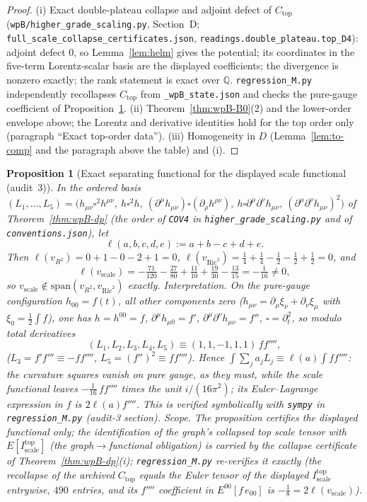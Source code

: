 \documentclass{article}
\newtheorem{proposition}{Proposition}
\theoremstyle{remark}
\begin{document}
\begin{proof}
(i) Exact double-plateau collapse and adjoint defect of $C_{\mathrm{top}}$ (\texttt{wpB/higher\_grade\_scaling.py}, Section~D; \texttt{full\_scale\_collapse\_certificates.json}, \texttt{readings.double\_plateau.top\_D4}): adjoint defect $0$, so Lemma~\ref{lem:helm} gives the potential; its coordinates in the five-term Lorentz-scalar basis are the displayed coefficients; the divergence is nonzero exactly; the rank statement is exact over $\mathbb Q$.
\texttt{regression\_M.py} independently recollapses $C_{\mathrm{top}}$ from \texttt{\_wpB\_state.json} and checks the pure-gauge coefficient of Proposition~\ref{prop:wpB-sep}.
(ii) Theorem~\ref{thm:wpB-B0}(2) and the lower-order envelope above; the Lorentz and derivative identities hold for the top order only (paragraph ``Exact top-order data'').
(iii) Homogeneity in $D$ (Lemma~\ref{lem:to-comp} and the paragraph above the table) and (i).
\end{proof}

\begin{proposition}[Exact separating functional for the displayed scale functional (audit~3)]
\label{prop:wpB-sep}
In the ordered basis $(L_1,\dots,L_5)=\bigl(h_{\mu\nu}\square^2h^{\mu\nu},\ h\square^2h,\ (\partial^\mu h_{\mu\nu})\square(\partial_\rho h^{\rho\nu}),\ h\square\partial^\mu\partial^\nu h_{\mu\nu},\ (\partial^\mu\partial^\nu h_{\mu\nu})^2\bigr)$ of Theorem~\ref{thm:wpB-dp} (the order of \texttt{COV4} in \texttt{higher\_grade\_scaling.py} and of \texttt{conventions.json}), let
\[
\ell(a,b,c,d,e):=a+b-c+d+e .
\]
Then $\ell(v_{R^2})=0+1-0-2+1=0$, $\ell(v_{\mathrm{Ric}^2})=\frac14+\frac14-\frac12-\frac12+\frac12=0$, and
\[
\ell(v_{\mathrm{scale}})=-\tfrac{71}{120}-\tfrac{27}{80}+\tfrac{11}{10}+\tfrac{19}{30}-\tfrac{13}{15}=-\tfrac1{16}\neq0,
\]
so $v_{\mathrm{scale}}\notin\mathrm{span}(v_{R^2},v_{\mathrm{Ric}^2})$ exactly.
\emph{Interpretation.} On the pure-gauge configuration $h_{00}=f(t)$, all other components zero ($h_{\mu\nu}=\partial_\mu\xi_\nu+\partial_\nu\xi_\mu$ with $\xi_0=\frac12\int f$), one has $h=h^{00}=f$, $\partial^\mu h_{\mu0}=f'$, $\partial^\mu\partial^\nu h_{\mu\nu}=f''$, $\square=\partial_t^2$, so modulo total derivatives
\[
(L_1,L_2,L_3,L_4,L_5)\equiv(1,1,-1,1,1)\,f f'''' ,
\]
($L_3=f'f'''\equiv-ff''''$, $L_5=(f'')^2\equiv ff''''$). Hence $\int\sum_ja_jL_j\equiv\ell(a)\int ff''''$: the curvature squares vanish on pure gauge, as they must, while the scale functional leaves $-\frac1{16}\,ff''''$ times the unit $i/(16\pi^2)$; its Euler--Lagrange expression in $f$ is $2\ell(a)f''''$.
This is verified symbolically with \texttt{sympy} in \texttt{regression\_M.py} (audit-3 section).
\emph{Scope.} The proposition certifies the displayed functional only; the identification of the graph's collapsed top scale tensor with $E[I^{\mathrm{top}}_{\mathrm{scale}}]$ (the graph$\to$functional obligation) is carried by the collapse certificate of Theorem~\ref{thm:wpB-dp}(i); \texttt{regression\_M.py} re-verifies it exactly (the recollapse of the archived $C_{\mathrm{top}}$ equals the Euler tensor of the displayed $I^{\mathrm{top}}_{\mathrm{scale}}$ entrywise, $490$ entries, and its $f''''$ coefficient in $E^{00}[f\,e_{00}]$ is $-\frac18=2\ell(v_{\mathrm{scale}})$).
\end{proposition}
\end{document}
